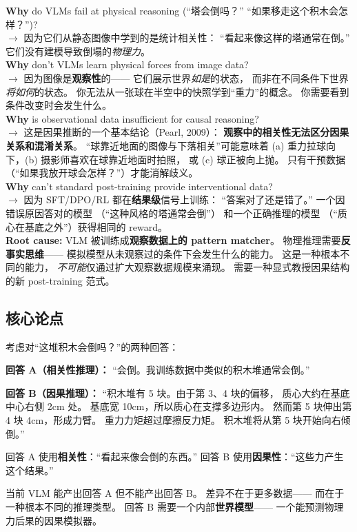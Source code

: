 \documentclass[12pt,a4paper]{article}
\begin{document}
\begin{whybox}
\textbf{Why} do VLMs fail at physical reasoning
(``塔会倒吗？'' ``如果移走这个积木会怎样？'')?\\
$\rightarrow$ 因为它们从静态图像中学到的是统计相关性：
``看起来像这样的塔通常在倒。''
它们没有建模导致倒塌的\textit{物理力}。\\[3pt]
\textbf{Why} don't VLMs learn physical forces from image data?\\
$\rightarrow$ 因为图像是\textbf{观察性}的——
它们展示世界\textit{如是}的状态，
而非在不同条件下世界\textit{将如何}的状态。
你无法从一张球在半空中的快照学到``重力''的概念。
你需要看到条件改变时会发生什么。\\[3pt]
\textbf{Why} is observational data insufficient for causal reasoning?\\
$\rightarrow$ 这是因果推断的一个基本结论（Pearl, 2009）：
\textbf{观察中的相关性无法区分因果关系和混淆关系}。
``球靠近地面的图像与下落相关''可能意味着
(a) 重力拉球向下，(b) 摄影师喜欢在球靠近地面时拍照，
或 (c) 球正被向上抛。
只有干预数据（``如果我放开球会怎样？''）才能消解歧义。\\[3pt]
\textbf{Why} can't standard post-training provide interventional data?\\
$\rightarrow$ 因为 SFT/DPO/RL 都在\textbf{结果级}信号上训练：
``答案对了还是错了。''
一个因错误原因答对的模型
（``这种风格的塔通常会倒''）
和一个正确推理的模型
（``质心在基底之外''）获得相同的 reward。\\[3pt]
\textbf{Root cause:}
VLM 被训练成\textbf{观察数据上的 pattern matcher}。
物理推理需要\textbf{反事实思维}——
模拟模型从未观察过的条件下会发生什么的能力。
这是一种根本不同的能力，
\textit{不可能}仅通过扩大观察数据规模来涌现。
需要一种显式教授因果结构的新 post-training 范式。
\end{whybox}

\subsection{核心论点}

\begin{insightbox}
考虑对``这堆积木会倒吗？''的两种回答：

\textbf{回答 A（相关性推理）：}
``会倒。我训练数据中类似的积木堆通常会倒。''

\textbf{回答 B（因果推理）：}
``积木堆有 5 块。由于第 3、4 块的偏移，
质心大约在基底中心右侧 2cm 处。
基底宽 10cm，所以质心在支撑多边形内。
然而第 5 块伸出第 4 块 4cm，形成力臂。
重力力矩超过摩擦反力矩。
积木堆将从第 5 块开始向右倾倒。''

回答 A 使用\textbf{相关性}：``看起来像会倒的东西。''
回答 B 使用\textbf{因果性}：``这些力产生这个结果。''

当前 VLM 能产出回答 A 但不能产出回答 B。
差异不在于更多数据——
而在于一种根本不同的推理类型。
回答 B 需要一个内部\textbf{世界模型}——
一个能预测物理力后果的因果模拟器。
\end{insightbox}
\end{document}
